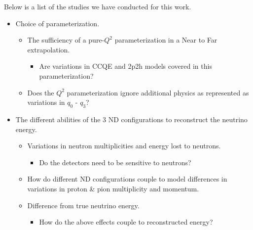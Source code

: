 \documentclass[12pt]{article}
\begin{document}
Below is a list of the studies we have conducted for this work.
\begin{itemize}
\item Choice of parameterization.
	\begin{itemize}
	\item The sufficiency of a pure-$Q^2$ parameterization in a Near to Far extrapolation.
		\begin{itemize}
			\item Are variations in CCQE and 2p2h models covered in this parameterization?
		\end{itemize} 
	\item Does the $Q^2$ parameterization ignore additional physics as represented as variations in
	 $q_0 \textrm{ - } q_3$?

	\end{itemize}
\item The different abilities of the 3 ND configurations to reconstruct the neutrino energy.
	\begin{itemize}
	\item Variations in neutron multiplicities and energy lost to neutrons.
	\begin{itemize}
			\item Do the detectors need to be sensitive to neutrons?
	\end{itemize} 
	\item How do different ND configurations couple to model differences in variations in proton \& pion multiplicity and momentum.
	\item Difference from true neutrino energy.
	\begin{itemize}
		\item How do the above effects couple to reconstructed energy?
	\end{itemize} 
	\end{itemize}


\end{itemize}
\end{document}
